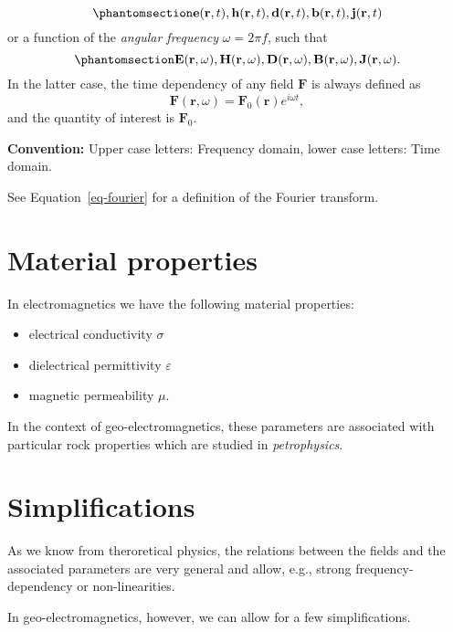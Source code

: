 \documentclass[
  a4paper,
  DIV=11,
  numbers=noendperiod]{scrreprt}
\providecommand{\tightlist}{%
  \setlength{\itemsep}{0pt}\setlength{\parskip}{0pt}}\usepackage{longtable,booktabs,array}
\begin{document}
\begin{equation}\phantomsection\label{eq-fields-time}{
\mathbf e(\mathbf r, t), \mathbf h(\mathbf r, t), \mathbf d(\mathbf r, t), \mathbf b(\mathbf r, t),
\mathbf j(\mathbf r, t)
}\end{equation} or a function of the \emph{angular frequency}
\(\omega = 2 \pi f\), such that
\begin{equation}\phantomsection\label{eq-fields-frequency}{
\mathbf E(\mathbf r, \omega), \mathbf H(\mathbf r, \omega), \mathbf D(\mathbf r, \omega), \mathbf B(\mathbf r, \omega),
\mathbf J(\mathbf r, \omega).
}\end{equation} In the latter case, the time dependency of any field
\(\mathbf F\) is always defined as \[ 
\mathbf F(\mathbf r, \omega) = \mathbf F_0(\mathbf r) e^{i \omega t},
\] and the quantity of interest is \(\mathbf F_0\).

\textbf{Convention:} Upper case letters: Frequency domain, lower case
letters: Time domain.

See Equation~\ref{eq-fourier} for a definition of the Fourier transform.

\section{Material properties}\label{material-properties}

In electromagnetics we have the following material properties:

\begin{itemize}
\tightlist
\item
  electrical conductivity \(\sigma\)
\item
  dielectrical permittivity \(\varepsilon\)
\item
  magnetic permeability \(\mu\).
\end{itemize}

In the context of geo-electromagnetics, these parameters are associated
with particular rock properties which are studied in
\emph{petrophysics}.

\section{Simplifications}\label{simplifications}

As we know from theroretical physics, the relations between the fields
and the associated parameters are very general and allow, e.g., strong
frequency-dependency or non-linearities.

In geo-electromagnetics, however, we can allow for a few
simplifications.
\end{document}
